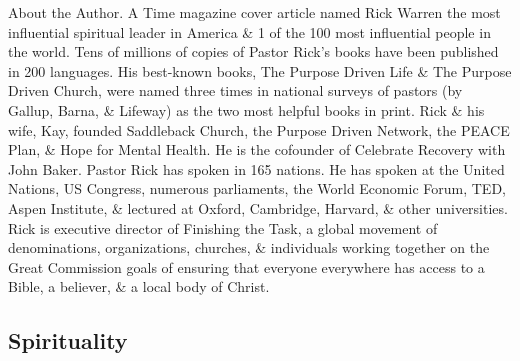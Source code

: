 \documentclass{article}
\begin{document}
\begin{enumerate}
	{\sf About the Author.} A Time magazine cover article named Rick Warren the most influential spiritual leader in America \& 1 of the 100 most influential people in the world. Tens of millions of copies of Pastor Rick's books have been published in 200 languages. His best-known books, The Purpose Driven Life \& The Purpose Driven Church, were named three times in national surveys of pastors (by Gallup, Barna, \& Lifeway) as the two most helpful books in print. Rick \& his wife, Kay, founded Saddleback Church, the Purpose Driven Network, the PEACE Plan, \& Hope for Mental Health. He is the cofounder of Celebrate Recovery with John Baker. Pastor Rick has spoken in 165 nations. He has spoken at the United Nations, US Congress, numerous parliaments, the World Economic Forum, TED, Aspen Institute, \& lectured at Oxford, Cambridge, Harvard, \& other universities. Rick is executive director of Finishing the Task, a global movement of denominations, organizations, churches, \& individuals working together on the Great Commission goals of ensuring that everyone everywhere has access to a Bible, a believer, \& a local body of Christ.	
\end{enumerate}


\subsection{Spirituality}
\end{document}
